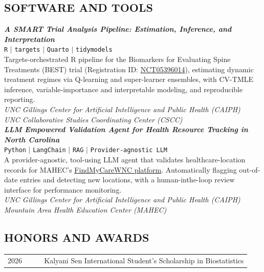 \documentclass[11pt]{scrartcl}
\begin{document}
\subsection{\MakeUppercase{Software and Tools}}\label{software}
\noindent
{\def\arraystretch{1.2}

\textit{\textbf{A SMART Trial Analysis Pipeline: Estimation,  Inference, and Interpretation}} \\
\texttt{R} $\mid$ \texttt{targets} $\mid$ \texttt{Quarto} $\mid$ \texttt{tidymodels}\\
{
Targets-orchestrated R pipeline for the Biomarkers for Evaluating Spine Treatments (BEST) trial (Registration ID: \href{https://clinicaltrials.gov/study/NCT05396014}{NCT05396014}), estimating dynamic treatment regimes via Q-learning and super-learner ensembles, with CV-TMLE inference, variable-importance and interpretable modeling, and reproducible reporting.
}\\[0.3em]
\emph{
UNC Gillings Center for Artificial Intelligence and Public Health (CAIPH)\\
UNC Collaborative Studies Coordinating Center (CSCC)}\\


\textit{\textbf{LLM Empowered Validation Agent for Health Resource Tracking in North Carolina}} \\
\texttt{Python} $\mid$ \texttt{LangChain} $\mid$ \texttt{RAG} $\mid$ \texttt{Provider-agnostic LLM} \\
{
A provider-agnostic, tool-using LLM agent that validates healthcare-location records for MAHEC's \href{https://mahec.net/regional-initiatives/itacc-resource-map}{FindMy\-CareWNC platform}. Automatically flagging out-of-date entries and detecting new locations, with a human-in\-the-loop review interface for performance monitoring.
}\\[0.3em]
\emph{
UNC Gillings Center for Artificial Intelligence and Public Health (CAIPH)\\ 
Mountain Area Health Education Center (MAHEC)
}

\subsection{\MakeUppercase{Honors and Awards}}\label{honours-and-awards}
\noindent
{\def\arraystretch{1.2}\tabcolsep=0pt
\begin{longtable}{p{0.15\linewidth}p{0.85\linewidth}}

  2026 & Kalyani Sen International Student's Scholarship in Biostatistics \\


\end{longtable}}}
\end{document}
